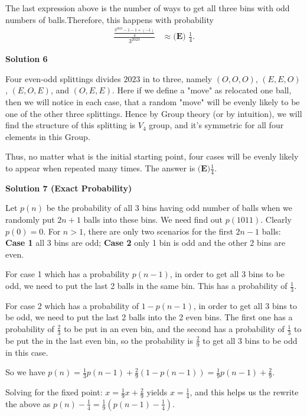 \begin{enumerate}
 The last expression above is the number of ways to get all three bins with odd numbers of balls.Therefore, this happens with probability
 \begin{align*} \frac{\frac{3^{2023} - 1 - 1 + (-1)}{4}}{3^{2023}} & \approx \boxed{\textbf{(E) } \frac{1}{4}}. \end{align*}





\textbf{Solution 6}

Four even-odd splittings divides $2023$ in to three, namely $(O,O,O)$, $(E,E,O)$, $(E,O,E)$, and $(O,E,E)$. Here if we define a "move" as relocated one ball, then we will notice in each case, that a random "move" will be evenly likely to be one of the other three splittings. Hence by Group theory (or by intuition), we will find the structure of this splitting is $V_4$ group, and it's symmetric for all four elements in this Group.

 Thus, no matter what is the initial starting point, four cases will be evenly likely to appear when repeated many times. The answer is $\boxed{\textbf{(E)} \frac{1}{4}}$.

 



\textbf{Solution 7 (Exact Probability)}

Let $p(n)$ be the probability of all 3 bins having odd number of balls when we randomly put $2n+1$ balls into these bins. We need find out $p(1011)$. Clearly $p(0)=0$. For $n>1$, there are only two scenarios for the first $2n-1$ balls: \textbf{Case 1} all 3 bins are odd; \textbf{Case 2} only 1 bin is odd and the other 2 bins are even.

 For case 1 which has a probability $p(n-1)$, in order to get all 3 bins to be odd, we need to put the last 2 balls in the same bin. This has a probability of $\frac{1}{3}$. 

 For case 2 which has a probability of $1-p(n-1)$, in order to get all 3 bins to be odd, we need to put the last 2 balls into the 2 even bins. The first one has a probability of $\frac{2}{3}$ to be put in an even bin, and the second has a probability of $\frac{1}{3}$ to be put the in the last even bin, so the probability is $\frac{2}{9}$ to get all 3 bins to be odd in this case.

 So we have $p(n)=\frac{1}{3} p(n-1) + \frac{2}{9} (1-p(n-1)) = \frac{1}{9} p(n-1) + \frac{2}{9}$.

 Solving for the fixed point: $x=\frac{1}{9} x + \frac{2}{9}$ yields $x=\frac{1}{4}$, and this helps us the rewrite the above as $p(n) - \frac{1}{4} = \frac{1}{9} (p(n-1)  - \frac{1}{4} )$.


\end{enumerate}
